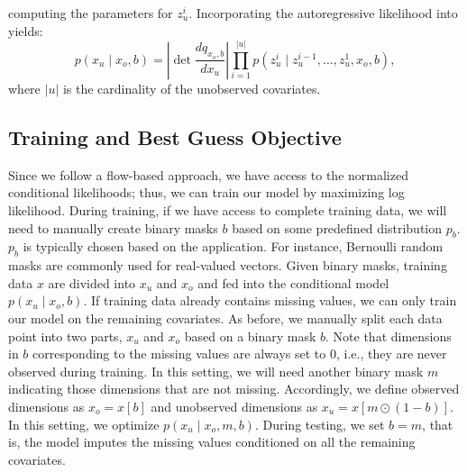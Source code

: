 \documentclass[letterpaper]{article} %
\begin{document}
computing the parameters for $z_u^i$. Incorporating the autoregressive likelihood into yields:
\begin{equation}
    p(x_u \mid x_o, b) = \left| \det \frac{dq_{x_o,b}}{dx_u} \right| \prod_{i=1}^{|u|} p(z_u^i \mid z_u^{i-1},...,z_u^{1}, x_o, b),
\end{equation}
where $|u|$ is the cardinality of the unobserved covariates.
\subsection{Training and Best Guess Objective}
Since we follow a flow-based approach, we have access to the normalized conditional likelihoods; thus, we can train our model by maximizing log likelihood.
During training, if we have access to complete training data, we will need to manually create binary masks $b$ based on some predefined distribution $p_b$. $p_b$ is typically chosen based on the application. For instance, Bernoulli random masks are commonly used for real-valued vectors. Given binary masks, training data $x$ are divided into $x_u$ and $x_o$ and fed into the conditional model $p(x_u \mid x_o,b)$.
If training data already contains missing values, we can only train our model on the remaining covariates. As before, we manually split each data point into two parts, $x_u$ and $x_o$ based on a binary mask $b$. Note that dimensions in $b$ corresponding to the missing values are always set to $0$, i.e., they are never observed during training. In this setting, we will need another binary mask $m$ indicating those dimensions that are not missing. Accordingly, we define observed dimensions as $x_o=x\left[b\right]$ and unobserved dimensions as $x_u=x\left[m \odot (1-b)\right]$. In this setting, we optimize $p(x_u \mid x_o,m,b)$. During testing, we set $b=m$, that is, the model imputes the missing values conditioned on all the remaining covariates.
\end{document}

